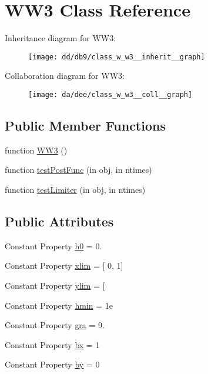\hypertarget{class_w_w3}{}\section{W\+W3 Class Reference}
\label{class_w_w3}


Inheritance diagram for W\+W3\+:
\nopagebreak
\begin{figure}[H]
\begin{center}
\leavevmode
\texttt{[image: dd/db9/class\_w\_w3\_\_inherit\_\_graph]}
\end{center}
\end{figure}


Collaboration diagram for W\+W3\+:
\nopagebreak
\begin{figure}[H]
\begin{center}
\leavevmode
\texttt{[image: da/dee/class\_w\_w3\_\_coll\_\_graph]}
\end{center}
\end{figure}
\subsection*{Public Member Functions}
\begin{DoxyCompactItemize}
\item 
function \hyperlink{class_w_w3_a56bb8d75227bf8e8fa2eb4e4c2da8e33}{W\+W3} ()
\item 
function \hyperlink{class_w_w3_aecb38e4ef8753472953c06aafccf0688}{test\+Post\+Func} (in obj, in ntimes)
\item 
function \hyperlink{class_w_w3_a79431272fb45987619b062f39b6a7277}{test\+Limiter} (in obj, in ntimes)
\end{DoxyCompactItemize}
\subsection*{Public Attributes}
\begin{DoxyCompactItemize}
\item 
Constant Property \hyperlink{class_w_w3_a90b8a7e997c8962ab51d2fe4b0977bad}{h0} = 0.
\item 
Constant Property \hyperlink{class_w_w3_abdd56b5e1ca6d0944b263403438d99f7}{xlim} = \mbox{[} 0, 1\mbox{]}
\item 
Constant Property \hyperlink{class_w_w3_a930654d6c35905f1195b19ecf551af95}{ylim} = \mbox{[}
\item 
Constant Property \hyperlink{class_w_w3_a8e141d1da6f3f16f64c1258d1677b175}{hmin} = 1e
\item 
Constant Property \hyperlink{class_w_w3_a11e02c8db208c03adc58d26c934ad8a3}{gra} = 9.
\item 
Constant Property \hyperlink{class_w_w3_a8ef36fc579e1e817a898fab1bfadca7c}{bx} = 1
\item 
Constant Property \hyperlink{class_w_w3_a46674762f9b334d5a34905879b262174}{by} = 0
\end{DoxyCompactItemize}
